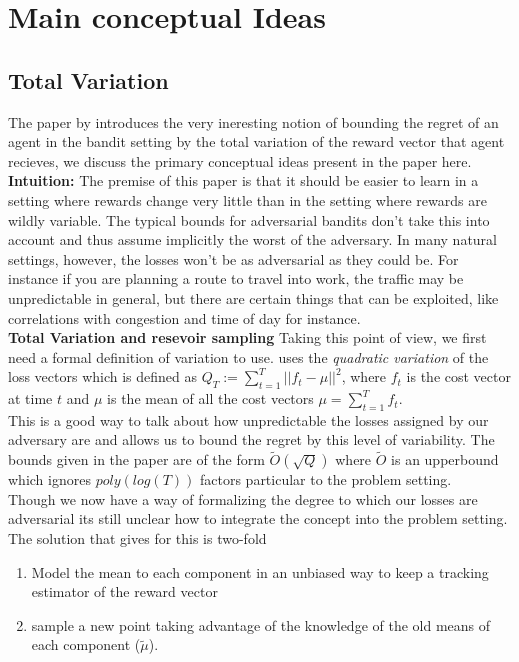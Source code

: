 \section{Main conceptual Ideas}
\subsection{Total Variation }
The paper by \citep{hazan} introduces the very ineresting notion of bounding
the regret of an agent in the bandit setting by the total variation of the reward vector 
that agent recieves, we discuss the primary conceptual ideas present in the paper here. \\

\textbf{Intuition:}
The premise of this paper is that it should be easier to learn in a setting where
rewards change very little than in the setting where rewards are wildly variable. 
The typical bounds for adversarial bandits don't take this into account and thus assume implicitly the 
worst of the adversary. In many natural settings, however, the losses won't be as adversarial as they could be. For
instance if you are planning a route to travel into work, the traffic may be unpredictable in general, but there 
are certain things that can be exploited, like correlations with congestion and time of day for instance.\\

\textbf{Total Variation and resevoir sampling}
Taking this point of view, we first need a formal definition of variation to use.  \citep{hazan} uses the
\textit{quadratic variation} of the loss vectors  which is defined as $Q_T := \sum_{t=1}^T || f_t - \mu ||^2$,
where $f_t$ is the cost vector at time $t$ and $\mu$ is the mean of all the cost vectors
$\mu = \sum_{t=1}^T f_t$. \\

This is a good  way to talk about how unpredictable the losses assigned by our adversary are and allows us to bound the
regret by this level of variability. The bounds given in the paper are of the form
$\tilde{O}(\sqrt{Q})$ where $\tilde{O}$ is an upperbound which ignores $poly(log(T))$ factors
particular to the problem setting. \\

Though we now have a way of formalizing the degree to which our losses are adversarial its still unclear
how to integrate the concept into the problem setting. The solution that \citep{hazan} gives for this is two-fold

\begin{enumerate}
\item
  Model the mean to each component in an unbiased way to keep a tracking estimator of the reward vector 
\item
  sample a new point taking advantage of the knowledge of the old means of each component ($\tilde{\mu}$).
\end{enumerate}

